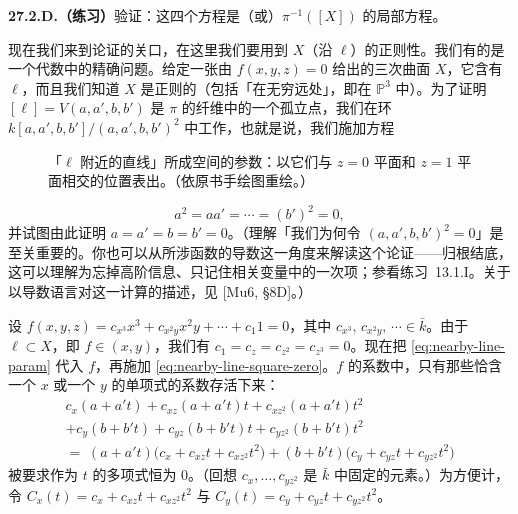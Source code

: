 \textbf{27.2.D.（练习）}\quad 验证：这四个方程是\trSchemeTheoreticFiber（或\trSchemeTheoreticPreimage）$\pi^{-1}([X])$ 的局部方程。

现在我们来到论证的关口，在这里我们要用到 $X$（沿 $\ell$）的正则性。我们有的是一个代数中的精确问题。给定一张由 $f(x,y,z)=0$ 给出的三次曲面 $X$，它含有 $\ell$，而且我们知道 $X$ 是正则的（包括「在无穷远处」，即在 $\mathbb{P}^{3}$ 中）。为了证明 $[\ell]=V(a,a',b,b')$ 是 $\pi$ 的纤维中的一个\trReduced{}孤立点，我们在环 $k[a,a',b,b']/(a,a',b,b')^{2}$ 中工作，也就是说，我们施加方程

\begin{figure}[htbp]
\centering
{}
\caption{「$\ell$ 附近的直线」所成空间的参数：以它们与 $z=0$ 平面和 $z=1$ 平面相交的位置表出。（依原书手绘图重绘。）}\label{fig:lines-near-ell}
\end{figure}

\[
\tag{27.2.3.2}\label{eq:nearby-line-square-zero}
a^{2}=aa'=\cdots=(b')^{2}=0,
\]
并试图由此证明 $a=a'=b=b'=0$。（理解「我们为何令 $(a,a',b,b')^{2}=0$」是至关重要的。你也可以从所涉函数的导数这一角度来解读这个论证——归根结底，这可以理解为忘掉高阶信息、只记住相关变量中的一次项；参看\mbox{练习~13.1.I}。关于以导数语言对这一计算的描述，见 [Mu6, \S8D]。）

设 $f(x,y,z)=c_{x^{3}}x^{3}+c_{x^{2}y}x^{2}y+\cdots+c_{1}1=0$，其中 $c_{x^{3}},\,c_{x^{2}y},\,\cdots\in\bar{k}$。由于 $\ell\subset X$，即 $f\in(x,y)$，我们有 $c_{1}=c_{z}=c_{z^{2}}=c_{z^{3}}=0$。现在把 \eqref{eq:nearby-line-param} 代入 $f$，再施加 \eqref{eq:nearby-line-square-zero}。$f$ 的系数中，只有那些恰含一个 $x$ 或一个 $y$ 的单项式的系数存活下来：
\begin{multline*}
c_{x}(a+a't)+c_{xz}(a+a't)t+c_{xz^{2}}(a+a't)t^{2} \\
+c_{y}(b+b't)+c_{yz}(b+b't)t+c_{yz^{2}}(b+b't)t^{2} \\
=\;(a+a't)\bigl(c_{x}+c_{xz}t+c_{xz^{2}}t^{2}\bigr)+(b+b't)\bigl(c_{y}+c_{yz}t+c_{yz^{2}}t^{2}\bigr)
\end{multline*}
被要求作为 $t$ 的多项式恒为 $0$。（回想 $c_{x},\dots,c_{yz^{2}}$ 是 $\bar{k}$ 中固定的元素。）为方便计，令 $C_{x}(t)=c_{x}+c_{xz}t+c_{xz^{2}}t^{2}$ 与 $C_{y}(t)=c_{y}+c_{yz}t+c_{yz^{2}}t^{2}$。

